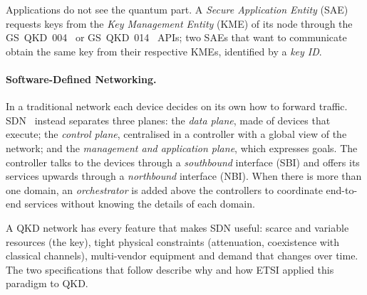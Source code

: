 

Applications do not see the quantum part. A \emph{Secure Application
Entity} (SAE) requests keys from the \emph{Key Management Entity} (KME) of
its node through the GS~QKD~004~\cite{qkd004} or GS~QKD~014~\cite{qkd014}
APIs; two SAEs that want to communicate obtain the same key from their
respective KMEs, identified by a \emph{key ID}.

\paragraph{Software-Defined Networking.}
In a traditional network each device decides on its own how to forward
traffic. SDN~\cite{kreutz2015} instead separates three planes: the
\emph{data plane}, made of devices that execute; the \emph{control plane},
centralised in a controller with a global view of the network; and the
\emph{management and application plane}, which expresses goals. The
controller talks to the devices through a \emph{southbound} interface (SBI)
and offers its services upwards through a \emph{northbound} interface
(NBI). When there is more than one domain, an \emph{orchestrator} is added
above the controllers to coordinate end-to-end services without knowing
the details of each domain.

A QKD network has every feature that makes SDN useful: scarce and variable
resources (the key), tight physical constraints (attenuation, coexistence
with classical channels), multi-vendor equipment and demand that changes
over time. The two specifications that follow describe why and how ETSI
applied this paradigm to QKD.
